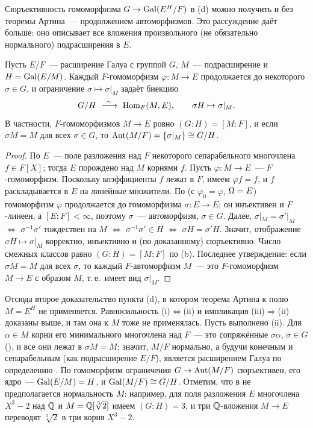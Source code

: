 Сюръективность гомоморфизма $G\to\operatorname{Gal}(E^H/F)$ в (d) можно получить и без теоремы Артина~--- продолжением автоморфизмов.
Это рассуждение даёт больше: оно описывает все вложения произвольного (не обязательно нормального) подрасширения в $E$.

\begin{proposition}[3.17b]
Пусть $E/F$~--- расширение Галуа с группой $G$, $M$~--- подрасширение и $H=\operatorname{Gal}(E/M)$. Каждый $F$-гомоморфизм
$\varphi\colon M\to E$ продолжается до некоторого $\sigma\in G$, и ограничение $\sigma\mapsto\sigma|_M$ задаёт биекцию
\[
G/H\ \xrightarrow{\ \sim\ }\ \Hom_F(M,E),\qquad \sigma H\mapsto\sigma|_M .
\]
В частности, $F$-гомоморфизмов $M\to E$ ровно $(G:H)=[M:F]$, и если $\sigma M=M$ для всех $\sigma\in G$, то
$\operatorname{Aut}(M/F)=\{\sigma|_M\}\cong G/H$.
\end{proposition}

\begin{proof}
По  $E$~--- поле разложения над $F$ некоторого сепарабельного многочлена $f\in F[X]$; тогда $E$ порождено над $M$
корнями $f$. Пусть $\varphi\colon M\to E$~--- $F$-гомоморфизм. Поскольку коэффициенты $f$ лежат в $F$, имеем $\varphi f=f$, и
$f$ раскладывается в $E$ на линейные множители. По  (с $\varphi_0=\varphi$, $\Omega=E$) гомоморфизм $\varphi$ продолжается
до гомоморфизма $\sigma\colon E\to E$; он инъективен и $F$-линеен, а $[E:F]<\infty$, поэтому $\sigma$~--- автоморфизм,
$\sigma\in G$. Далее, $\sigma|_M=\sigma'|_M$ $\iff$ $\sigma^{-1}\sigma'$ тождествен на $M$ $\iff$ $\sigma^{-1}\sigma'\in H$
$\iff$ $\sigma H=\sigma'H$. Значит, отображение $\sigma H\mapsto\sigma|_M$ корректно, инъективно и (по доказанному)
сюръективно. Число смежных классов равно $(G:H)=[M:F]$ по (b). Последнее утверждение: если $\sigma M=M$ для всех
$\sigma$, то каждый $F$-автоморфизм $M$~--- это $F$-гомоморфизм $M\to E$ с образом $M$, т.\,е.\ имеет вид $\sigma|_M$.
\end{proof}

Отсюда второе доказательство пункта (d), в котором теорема Артина к полю $M=E^H$ не применяется. Равносильность
(i)$\Leftrightarrow$(ii) и импликация (iii)$\Rightarrow$(ii) доказаны выше, и там она к $M$ тоже не
применялась. Пусть выполнено (ii). Для $\alpha\in M$ корни
его минимального многочлена над $F$~--- это сопряжённые $\sigma\alpha$, $\sigma\in G$ (), и все они лежат в $\sigma M=M$;
значит, $M/F$ нормально, а будучи конечным и сепарабельным (как подрасширение $E/F$), является расширением Галуа по
определению . По  гомоморфизм ограничения $G\to\operatorname{Aut}(M/F)$ сюръективен, его ядро~--- $\operatorname{Gal}(E/M)=H$, и
$\operatorname{Gal}(M/F)\cong G/H$. Отметим, что в
 не предполагается нормальность $M$: например, для поля разложения $E$ многочлена $X^3-2$ над $\mathbb Q$ и
$M=\mathbb Q[\sqrt[3]2]$ имеем $(G:H)=3$, и три $\mathbb Q$-вложения $M\to E$ переводят $\sqrt[3]2$ в три корня $X^3-2$.

